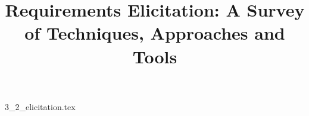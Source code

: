 \documentclass{article}      %
\title{Requirements Elicitation: A Survey of Techniques, Approaches and Tools}  %
\begin{document}

\maketitle                   %



{3_2_elicitation.tex}
\printbibliography
\end{document}
